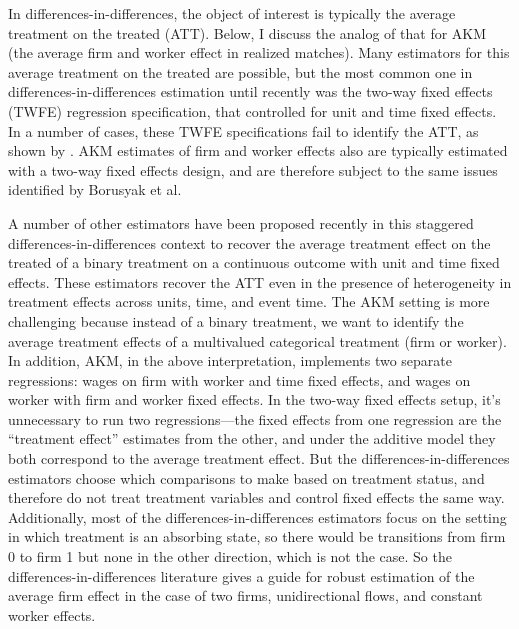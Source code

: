 \documentclass{article}
\begin{document}
In differences-in-differences, the object of interest is typically the average treatment on the treated (ATT). Below, I discuss the analog of that for AKM (the average firm and worker effect in realized matches). Many estimators for this average treatment on the treated are possible, but the most common one in differences-in-differences estimation until recently was the two-way fixed effects (TWFE) regression specification, that controlled for unit and time fixed effects. In a number of cases, these TWFE specifications fail to identify the ATT, as shown by \citet{borusyak2021revisiting}. AKM estimates of firm and worker effects also are typically estimated with a two-way fixed effects design, and are therefore subject to the same issues identified by Borusyak et al.

A number of other estimators have been proposed recently in this staggered differences-in-differences context to recover the average treatment effect on the treated of a binary treatment on a continuous outcome with unit and time fixed effects. These estimators recover the ATT even in the presence of heterogeneity in treatment effects across units, time, and event time. The AKM setting is more challenging because instead of a binary treatment, we want to identify the average treatment effects of a multivalued categorical treatment (firm or worker). In addition, AKM, in the above interpretation, implements two separate regressions: wages on firm with worker and time fixed effects, and wages on worker with firm and worker fixed effects. In the two-way fixed effects setup, it's unnecessary to run two regressions---the fixed effects from one regression are the ``treatment effect'' estimates from the other, and under the additive model they both correspond to the average treatment effect. But the differences-in-differences estimators choose which comparisons to make based on treatment status, and therefore do not treat treatment variables and control fixed effects the same way. Additionally, most of the differences-in-differences estimators focus on the setting in which treatment is an absorbing state, so there would be transitions from firm 0 to firm 1 but none in the other direction, which is not the case. So the differences-in-differences literature gives a guide for robust estimation of the average firm effect in the case of two firms, unidirectional flows, and constant worker effects.
\end{document}
